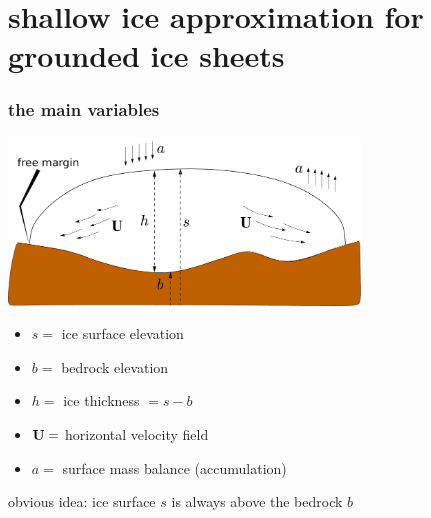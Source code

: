 \documentclass{beamer}
\begin{document}
\section[shallow ice approximation]{shallow ice approximation for grounded ice sheets}


\begin{frame}
  \frametitle{the main variables}

\begin{center}
\includegraphics[width=0.7\textwidth]{groundedscheme}
\end{center}

\begin{itemize}
\small
\item $s=$ ice surface elevation
\item $b=$ bedrock elevation
\item $h=$ ice thickness $ = s-b$
\item ${\bf U}=$ horizontal velocity field
\item $a=$ surface mass balance (accumulation)
\end{itemize}

\begin{alertblock}{obvious idea: ice surface $s$ is always above the bedrock $b$}
\end{alertblock}
\end{frame}
\end{document}
